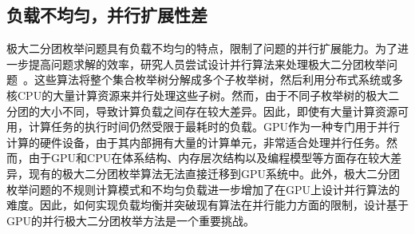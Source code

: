 

\subsection{负载不均匀，并行扩展性差}

极大二分团枚举问题具有负载不均匀的特点，限制了问题的并行扩展能力。为了进一步提高问题求解的效率，研究人员尝试设计并行算法来处理极大二分团枚举问题~\cite{mapreduceMBE16, MBEHe18, parMBE18}。这些算法将整个集合枚举树分解成多个子枚举树，然后利用分布式系统或多核CPU的大量计算资源来并行处理这些子树。然而，由于不同子枚举树的极大二分团的大小不同，导致计算负载之间存在较大差异。因此，即使有大量计算资源可用，计算任务的执行时间仍然受限于最耗时的负载。GPU作为一种专门用于并行计算的硬件设备，由于其内部拥有大量的计算单元，非常适合处理并行任务。然而，由于GPU和CPU在体系结构、内存层次结构以及编程模型等方面存在较大差异，现有的极大二分团枚举算法无法直接迁移到GPU系统中。此外，极大二分团枚举问题的不规则计算模式和不均匀负载进一步增加了在GPU上设计并行算法的难度。因此，如何实现负载均衡并突破现有算法在并行能力方面的限制，设计基于GPU的并行极大二分团枚举方法是一个重要挑战。


